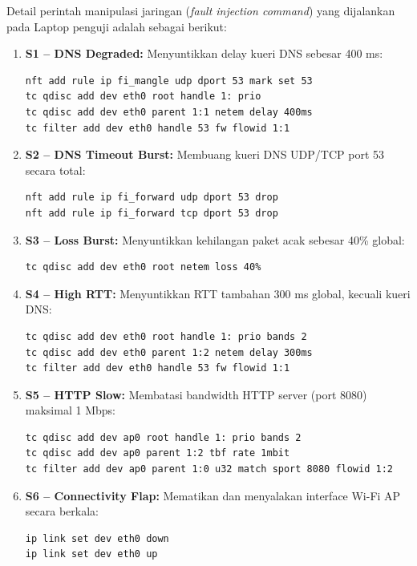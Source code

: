 Detail perintah manipulasi jaringan (\textit{fault injection command}) yang dijalankan pada Laptop penguji adalah sebagai berikut:
\begin{enumerate}
    \item \textbf{S1 -- DNS Degraded:} Menyuntikkan delay kueri DNS sebesar 400 ms:
    \begin{lstlisting}[language=bash]
nft add rule ip fi_mangle udp dport 53 mark set 53
tc qdisc add dev eth0 root handle 1: prio
tc qdisc add dev eth0 parent 1:1 netem delay 400ms
tc filter add dev eth0 handle 53 fw flowid 1:1
    \end{lstlisting}
    \item \textbf{S2 -- DNS Timeout Burst:} Membuang kueri DNS UDP/TCP port 53 secara total:
    \begin{lstlisting}[language=bash]
nft add rule ip fi_forward udp dport 53 drop
nft add rule ip fi_forward tcp dport 53 drop
    \end{lstlisting}
    \item \textbf{S3 -- Loss Burst:} Menyuntikkan kehilangan paket acak sebesar 40\% global:
    \begin{lstlisting}[language=bash]
tc qdisc add dev eth0 root netem loss 40%
    \end{lstlisting}
    \item \textbf{S4 -- High RTT:} Menyuntikkan RTT tambahan 300 ms global, kecuali kueri DNS:
    \begin{lstlisting}[language=bash]
tc qdisc add dev eth0 root handle 1: prio bands 2
tc qdisc add dev eth0 parent 1:2 netem delay 300ms
tc filter add dev eth0 handle 53 fw flowid 1:1
    \end{lstlisting}
    \item \textbf{S5 -- HTTP Slow:} Membatasi bandwidth HTTP server (port 8080) maksimal 1 Mbps:
    \begin{lstlisting}[language=bash]
tc qdisc add dev ap0 root handle 1: prio bands 2
tc qdisc add dev ap0 parent 1:2 tbf rate 1mbit
tc filter add dev ap0 parent 1:0 u32 match sport 8080 flowid 1:2
    \end{lstlisting}
    \item \textbf{S6 -- Connectivity Flap:} Mematikan dan menyalakan interface Wi-Fi AP secara berkala:
    \begin{lstlisting}[language=bash]
ip link set dev eth0 down
ip link set dev eth0 up
    \end{lstlisting}
\end{enumerate}

